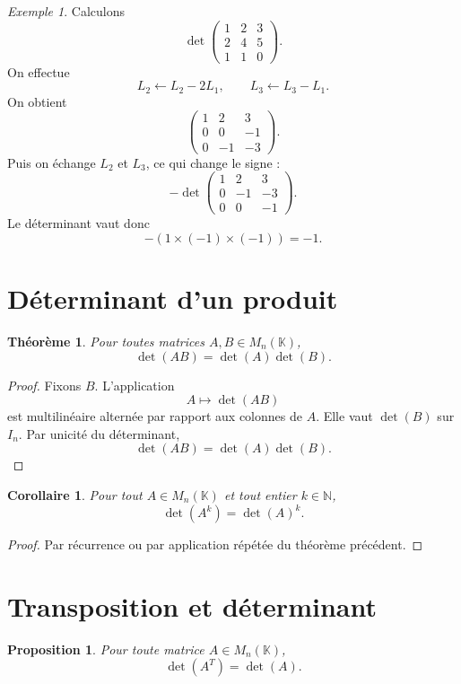 \documentclass[11pt,a4paper]{article}
\newtheorem{theoreme}[definition]{Théorème}
\newtheorem{proposition}[definition]{Proposition}
\newtheorem{corollaire}[definition]{Corollaire}
\theoremstyle{remark}
\newtheorem{exemple}[definition]{Exemple}
\newcommand{\K}{\mathbb{K}}
\newcommand{\N}{\mathbb{N}}
\begin{document}
\begin{exemple}
Calculons
\[
\det\begin{pmatrix}
1 & 2 & 3\\
2 & 4 & 5\\
1 & 1 & 0
\end{pmatrix}.
\]
On effectue
\[
L_2\leftarrow L_2-2L_1,\qquad L_3\leftarrow L_3-L_1.
\]
On obtient
\[
\begin{pmatrix}
1 & 2 & 3\\
0 & 0 & -1\\
0 & -1 & -3
\end{pmatrix}.
\]
Puis on échange \(L_2\) et \(L_3\), ce qui change le signe :
\[
-\det\begin{pmatrix}
1 & 2 & 3\\
0 & -1 & -3\\
0 & 0 & -1
\end{pmatrix}.
\]
Le déterminant vaut donc
\[
-(1\times (-1)\times (-1))=-1.
\]
\end{exemple}

\section{Déterminant d’un produit}

\begin{theoreme}
Pour toutes matrices \(A,B\in M_n(\K)\),
\[
\det(AB)=\det(A)\det(B).
\]
\end{theoreme}

\begin{proof}
Fixons \(B\). L’application
\[
A\mapsto \det(AB)
\]
est multilinéaire alternée par rapport aux colonnes de \(A\). Elle vaut \(\det(B)\) sur \(I_n\). Par unicité du déterminant,
\[
\det(AB)=\det(A)\det(B).
\]
\end{proof}

\begin{corollaire}
Pour tout \(A\in M_n(\K)\) et tout entier \(k\in\N\),
\[
\det(A^k)=\det(A)^k.
\]
\end{corollaire}

\begin{proof}
Par récurrence ou par application répétée du théorème précédent.
\end{proof}

\section{Transposition et déterminant}

\begin{proposition}
Pour toute matrice \(A\in M_n(\K)\),
\[
\det(A^T)=\det(A).
\]
\end{proposition}
\end{document}
